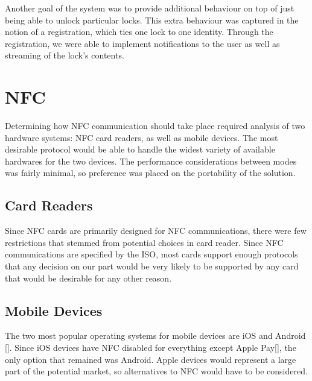 \documentclass[12pt]{report}
\begin{document}
Another goal of the system was to provide additional behaviour on top of just being able to unlock particular locks.
This extra behaviour was captured in the notion of a registration, which ties one lock to one identity. Through the
registration, we were able to implement notifications to the user as well as streaming of the lock's contents.



\section{NFC}

Determining how NFC communication should take place required analysis of two hardware systems: NFC card readers, as well
as mobile devices. The most desirable protocol would be able to handle the widest variety of available hardwares for
the two devices. The performance considerations between modes was fairly minimal, so preference was placed on the
portability of the solution.


\subsection{Card Readers}

Since NFC cards are primarily designed for NFC communications, there were few restrictions that stemmed from potential
choices in card reader. Since NFC communications are specified by the ISO, most cards support enough protocols that any
decision on our part would be very likely to be supported by any card that would be desirable for any other reason.


\subsection{Mobile Devices}

The two most popular operating systems for mobile devices are iOS and Android []. Since iOS devices have NFC disabled
for everything except Apple Pay[], the only option that remained was Android. Apple devices would represent a large
part of the potential market, so alternatives to NFC would have to be considered.
\end{document}
